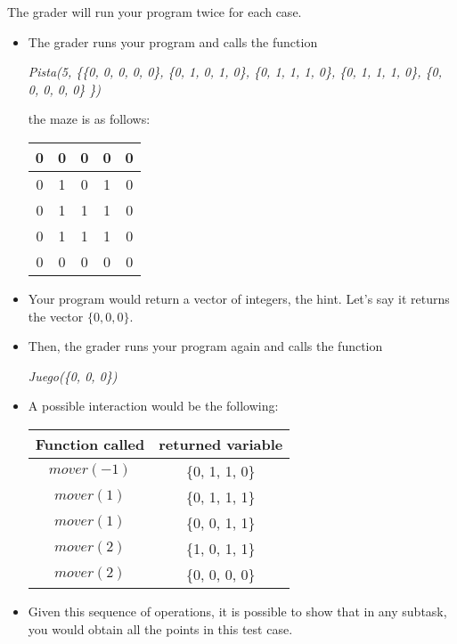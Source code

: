 \documentclass[12pt]{scrartcl}
\begin{document}
    The grader will run your program twice for each case.


        \begin{itemize}
            \item The grader runs your program and calls the function
            \begin{center}
                \textit{Pista(5, \{\{0, 0, 0, 0, 0\}, \{0, 1, 0, 1, 0\}, \{0, 1, 1, 1, 0\}, \{0, 1, 1, 1, 0\}, \{0, 0, 0, 0, 0\} \})}
            \end{center}
            the maze is as follows:
            \begin{center}
                \begin{tabular}{|c|c|c|c|c|}
                    \hline
                     0 & 0 & 0 & 0 & 0 \\
                     \hline
                     0 & 1 & 0 & 1 & 0 \\
                     \hline
                     0 & 1 & 1 & 1 & 0 \\
                     \hline
                     0 & 1 & 1 & 1 & 0 \\
                     \hline
                     0 & 0 & 0 & 0 & 0 \\
                     \hline
                \end{tabular}
            \end{center}
        \item Your program would return a vector of integers, the hint. Let's say it returns the vector $\{0, 0, 0\}$.

        \item Then, the grader runs your program again and calls the function 

        \begin{center}
            \textit{Juego(\{0, 0, 0\})}
        \end{center}
        
        \item A possible interaction would be the following:
        \begin{center}
            \begin{tabular}{|c|c|}
                \hline
                 Function called & returned variable \\
                 \hline
                 $mover(-1)$ & \{0, 1, 1, 0\} \\
                 \hline
                 $mover(1)$ & \{0, 1, 1, 1\} \\
                 \hline
                 $mover(1)$ & \{0, 0, 1, 1\} \\
                 \hline
                 $mover(2)$ & \{1, 0, 1, 1\} \\
                 \hline
                 $mover(2)$ & \{0, 0, 0, 0\} \\
                 \hline
            \end{tabular}
        \end{center}
        \item Given this sequence of operations, it is possible to show that in any subtask, you would obtain all the points in this test case.
        \end{itemize}
\end{document}
